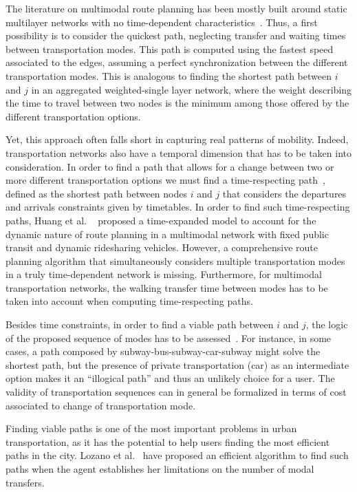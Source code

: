The literature on multimodal route planning has been mostly built around static multilayer networks with no time-dependent characteristics~\cite{bast2016route}. Thus, a first possibility is to consider the quickest path, neglecting transfer and waiting times between transportation modes. This path is computed using the fastest speed associated to the edges, assuming a perfect synchronization between the different transportation modes. This is analogous to finding the shortest path between $i$ and $j$ in an aggregated weighted-single layer network, where the weight describing the time to travel between two nodes is the minimum among those offered by the different transportation options.

Yet, this approach often falls short in capturing real patterns of mobility. Indeed, transportation networks also have a temporal dimension that has to be taken into consideration. In order to find a path that allows for a change between two or more different transportation options we must find a time-respecting path~\cite{Gallotti2014Efficiency}, defined as the shortest path between nodes $i$ and $j$ that considers the departures and arrivals constraints given by timetables. In order to find such time-respecting paths, Huang et al. ~\cite{huang2019route} proposed a time-expanded model to account for the dynamic nature of route planning in a multimodal network with fixed public transit and dynamic ridesharing vehicles. However, a comprehensive route planning algorithm that simultaneously considers multiple transportation modes in a truly time-dependent network is missing. Furthermore, for multimodal transportation networks, the walking transfer time between modes has to be taken into account when computing time-respecting paths. 

Besides time constraints, in order to find a viable path between $i$ and $j$, the logic of the proposed sequence of modes has to be assessed~\cite{battista1996path,lozano2001path}. For instance, in some cases, a path composed by subway-bus-subway-car-subway might solve the shortest path, but the presence of private transportation (car) as an intermediate option makes it an ``illogical path'' and thus an unlikely choice for a user. The validity of transportation sequences can in general be formalized in terms of cost associated to change of transportation mode.

Finding viable paths is one of the most important problems in urban transportation, as it has the potential to help users finding the most efficient paths in the city. Lozano et al.~\cite{lozano2001path} have proposed an efficient algorithm to find such paths when the agent establishes her limitations on the number of modal transfers.

